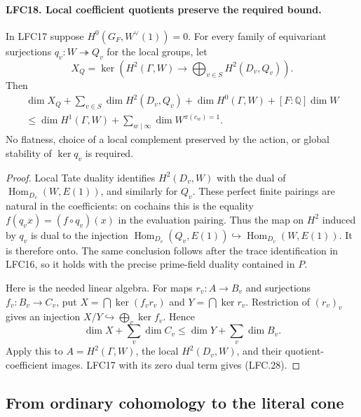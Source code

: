 \paragraph{LFC18. Local coefficient quotients preserve the required bound.}
\label{claim:LFC18}
In LFC17 suppose \(H^0(G_F,W^\vee(1))=0\).
For every family of equivariant surjections
\(q_v:W\twoheadrightarrow Q_v\) for the local groups,
let
\[
 X_Q=\ker\left(H^2(\Gamma,W)\longrightarrow
                              \bigoplus_{v\in S}H^2(D_v,Q_v)\right).
 \]
Then
\[
 \begin{split}
 \dim X_Q+\sum_{v\in S}\dim H^2(D_v,Q_v)
       +\dim H^0(\Gamma,W)+[F:\mathbb Q]\dim W\\
 \le \dim H^1(\Gamma,W)
       +\sum_{w\mid\infty}\dim W^{\pi(c_w)=1}.
 \end{split}                                           \tag{LFC.28}
\]
No flatness, choice of a local complement preserved by
the action, or global stability of \(\ker q_v\) is required.

\begin{proof}
Local Tate duality identifies \(H^2(D_v,W)\) with the
dual of \(\operatorname{Hom}_{D_v}(W,E(1))\), and similarly
for \(Q_v\).  These perfect finite pairings are natural
in the coefficients: on cochains this is the equality
\(f(q_v x)=(f\circ q_v)(x)\) in the evaluation pairing.
Thus the map on \(H^2\) induced by \(q_v\) is dual to the
injection
\(\operatorname{Hom}_{D_v}(Q_v,E(1))
 \hookrightarrow\operatorname{Hom}_{D_v}(W,E(1))\).
It is therefore onto.  The same conclusion follows after
the trace identification in LFC16, so it holds with the
precise prime-field duality contained in \(P\).

Here is the needed linear algebra.  For maps
\(r_v:A\to B_v\) and surjections \(f_v:B_v\to C_v\),
put \(X=\bigcap\ker(f_vr_v)\) and \(Y=\bigcap\ker r_v\).
Restriction of \((r_v)_v\) gives an injection
\(X/Y\hookrightarrow\bigoplus_v\ker f_v\).
Hence
\[
          \dim X+\sum_v\dim C_v
                   \le\dim Y+\sum_v\dim B_v.
 \]
Apply this to \(A=H^2(\Gamma,W)\), the local
\(H^2(D_v,W)\), and their quotient-coefficient images.
LFC17 with its zero dual term gives (LFC.28).
\end{proof}

\subsection{From ordinary cohomology to the literal cone}

